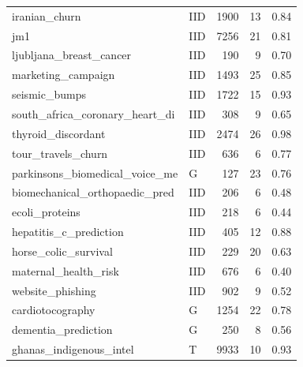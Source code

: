 \begin{longtable}{@{}p{6.3cm}lrrr@{}}
iranian\_\allowbreak{}churn & IID & 1900 & 13 & 0.84\\
jm1 & IID & 7256 & 21 & 0.81\\
ljubljana\_\allowbreak{}breast\_\allowbreak{}cancer & IID & 190 & 9 & 0.70\\
marketing\_\allowbreak{}campaign & IID & 1493 & 25 & 0.85\\
seismic\_\allowbreak{}bumps & IID & 1722 & 15 & 0.93\\
south\_\allowbreak{}africa\_\allowbreak{}coronary\_\allowbreak{}heart\_\allowbreak{}di & IID & 308 & 9 & 0.65\\
thyroid\_\allowbreak{}discordant & IID & 2474 & 26 & 0.98\\
tour\_\allowbreak{}travels\_\allowbreak{}churn & IID & 636 & 6 & 0.77\\
parkinsons\_\allowbreak{}biomedical\_\allowbreak{}voice\_\allowbreak{}me & G & 127 & 23 & 0.76\\
biomechanical\_\allowbreak{}orthopaedic\_\allowbreak{}pred & IID & 206 & 6 & 0.48\\
ecoli\_\allowbreak{}proteins & IID & 218 & 6 & 0.44\\
hepatitis\_\allowbreak{}c\_\allowbreak{}prediction & IID & 405 & 12 & 0.88\\
horse\_\allowbreak{}colic\_\allowbreak{}survival & IID & 229 & 20 & 0.63\\
maternal\_\allowbreak{}health\_\allowbreak{}risk & IID & 676 & 6 & 0.40\\
website\_\allowbreak{}phishing & IID & 902 & 9 & 0.52\\
cardiotocography & G & 1254 & 22 & 0.78\\
dementia\_\allowbreak{}prediction & G & 250 & 8 & 0.56\\
ghanas\_\allowbreak{}indigenous\_\allowbreak{}intel & T & 9933 & 10 & 0.93\\
\end{longtable}\endgroup
\begingroup\footnotesize\setlength{\tabcolsep}{3pt}\renewcommand{\arraystretch}{1.15}
\setlength\LTleft{0pt}\setlength\LTright{0pt}
